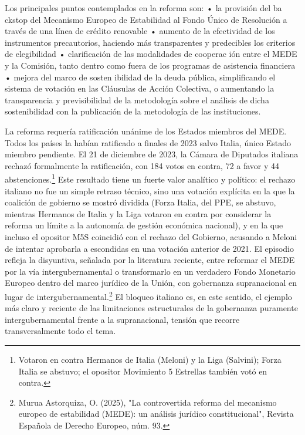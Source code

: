 \documentclass[10pt,a4paper]{article}
\begin{document}
 
Los principales puntos contemplados en la reforma son: 
• la provisión del ba ckstop del Mecanismo Europeo de Estabilidad al Fondo Único de Resolución a través de una línea de crédito renovable 
• aumento de la efectividad de los instrumentos precautorios, haciendo más transparentes y predecibles los criterios de elegibilidad 
• clarificación de las modalidades de cooperac ión entre el MEDE y la Comisión, tanto dentro como fuera de los programas de asistencia financiera 
• mejora del marco de sosten ibilidad de la deuda pública, simplificando el sistema de votación en las Cláusulas de Acción Colectiva, o aumentando la transparencia y previsibilidad de la metodología sobre el análisis de dicha sostenibilidad con la publicación de la metodología de las instituciones. 

La reforma requería ratificación unánime de los Estados miembros del MEDE. Todos los países la habían ratificado a finales de 2023 salvo Italia, único Estado miembro pendiente. El 21 de diciembre de 2023, la Cámara de Diputados italiana rechazó formalmente la ratificación, con 184 votos en contra, 72 a favor y 44 abstenciones.\footnote{%
    Votaron en contra Hermanos de Italia (Meloni) y la Liga (Salvini); Forza Italia se abstuvo; el opositor Movimiento 5 Estrellas también votó en contra.
} Este resultado tiene un fuerte valor analítico y político: el rechazo italiano no fue un simple retraso técnico, sino una votación explícita en la que la coalición de gobierno se mostró dividida (Forza Italia, del PPE, se abstuvo, mientras Hermanos de Italia y la Liga votaron en contra por considerar la reforma un límite a la autonomía de gestión económica nacional), y en la que incluso el opositor M5S coincidió con el rechazo del Gobierno, acusando a Meloni de intentar aprobarla a escondidas en una votación anterior de 2021. El episodio refleja la disyuntiva, señalada por la literatura reciente, entre reformar el MEDE por la vía intergubernamental o transformarlo en un verdadero Fondo Monetario Europeo dentro del marco jurídico de la Unión, con gobernanza supranacional en lugar de intergubernamental.\footnote{%
    Murua Astorquiza, O. (2025), "La controvertida reforma del mecanismo europeo de estabilidad (MEDE): un análisis jurídico constitucional", Revista Española de Derecho Europeo, núm. 93.
} El bloqueo italiano es, en este sentido, el ejemplo más claro y reciente de las limitaciones estructurales de la gobernanza puramente intergubernamental frente a la supranacional, tensión que recorre transversalmente todo el tema.
\end{document}
